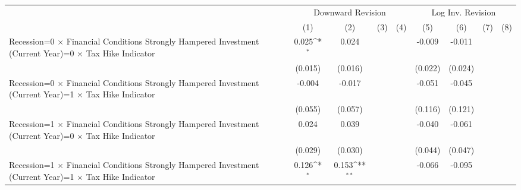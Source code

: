 {
\def\sym#1{\ifmmode^{#1}\else\(^{#1}\)\fi}
\begin{tabular}{l*{8}{c}}
\toprule
                    &\multicolumn{4}{c}{Downward Revision}                                                  &\multicolumn{4}{c}{Log Inv. Revision}                                                  \\\cmidrule(lr){2-5}\cmidrule(lr){6-9}
                    &\multicolumn{1}{c}{(1)}         &\multicolumn{1}{c}{(2)}         &\multicolumn{1}{c}{(3)}         &\multicolumn{1}{c}{(4)}         &\multicolumn{1}{c}{(5)}         &\multicolumn{1}{c}{(6)}         &\multicolumn{1}{c}{(7)}         &\multicolumn{1}{c}{(8)}         \\
\midrule
Recession=0 $\times$ Financial Conditions Strongly Hampered Investment (Current Year)=0 $\times$ Tax Hike Indicator&       0.025\sym{*}  &       0.024         &                     &                     &      -0.009         &      -0.011         &                     &                     \\
                    &     (0.015)         &     (0.016)         &                     &                     &     (0.022)         &     (0.024)         &                     &                     \\
Recession=0 $\times$ Financial Conditions Strongly Hampered Investment (Current Year)=1 $\times$ Tax Hike Indicator&      -0.004         &      -0.017         &                     &                     &      -0.051         &      -0.045         &                     &                     \\
                    &     (0.055)         &     (0.057)         &                     &                     &     (0.116)         &     (0.121)         &                     &                     \\
Recession=1 $\times$ Financial Conditions Strongly Hampered Investment (Current Year)=0 $\times$ Tax Hike Indicator&       0.024         &       0.039         &                     &                     &      -0.040         &      -0.061         &                     &                     \\
                    &     (0.029)         &     (0.030)         &                     &                     &     (0.044)         &     (0.047)         &                     &                     \\
Recession=1 $\times$ Financial Conditions Strongly Hampered Investment (Current Year)=1 $\times$ Tax Hike Indicator&       0.126\sym{*}  &       0.153\sym{**} &                     &                     &      -0.066         &      -0.095         &                     &                     \\

\end{tabular}}
